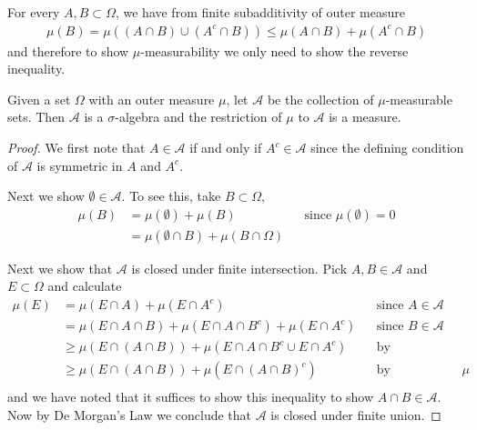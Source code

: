 \begin{rem}For every $A,B \subset \Omega$, we have from finite
  subadditivity of outer measure
\begin{align*}
\mu(B) = \mu((A \cap B) \cup (A^c \cap B)) \leq \mu(A \cap B) + \mu(A^c \cap B)
\end{align*}
and therefore to show $\mu$-measurability we only need to show the
reverse inequality.
\end{rem}

\begin{lem}\label{CaratheodoryRestriction}Given a set $\Omega$ with an outer measure $\mu$, let
$\mathcal{A}$ be the collection of $\mu$-measurable sets.  Then
$\mathcal{A}$ is a $\sigma$-algebra and the
  restriction of $\mu$ to $\mathcal{A}$ is a measure.
\end{lem}
\begin{proof}We first note that $A \in \mathcal{A}$ if and only if $A^c
  \in \mathcal{A}$ since the defining condition of $\mathcal{A}$ is
  symmetric in $A$ and $A^c$.

Next we show $\emptyset \in \mathcal{A}$.  To see this,
  take $B \subset \Omega$,
\begin{align*}
\mu(B) &= \mu(\emptyset) + \mu(B) & &\text{since $\mu(\emptyset) = 0$}
\\
& = \mu(\emptyset \cap B) + \mu(B \cap \Omega)
\end{align*}

Next we show that $\mathcal{A}$ is closed under finite intersection.
Pick $A, B \in \mathcal{A}$ and $E \subset \Omega$ and calculate
\begin{align*}
\mu(E) &= \mu(E \cap A) + \mu(E \cap A^c) & &\text{since $A \in
  \mathcal{A}$} \\
&= \mu(E \cap A \cap B) + \mu(E \cap A \cap B^c) +\mu(E \cap A^c) & &\text{since $B \in
  \mathcal{A}$} \\
&\geq \mu(E \cap (A \cap B)) + \mu(E \cap A \cap B^c \cup E \cap A^c)
& & \text{by subadditivity} \\
&\geq \mu(E \cap (A \cap B)) + \mu(E \cap (A \cap B)^c)
& & \text{by monotonicity of $\mu$} \\
\end{align*}
and we have noted that it suffices to show this inequality to show $A
\cap B \in \mathcal{A}$.  Now by De Morgan's Law we conclude that
$\mathcal{A}$ is closed under finite union.


\end{proof}
